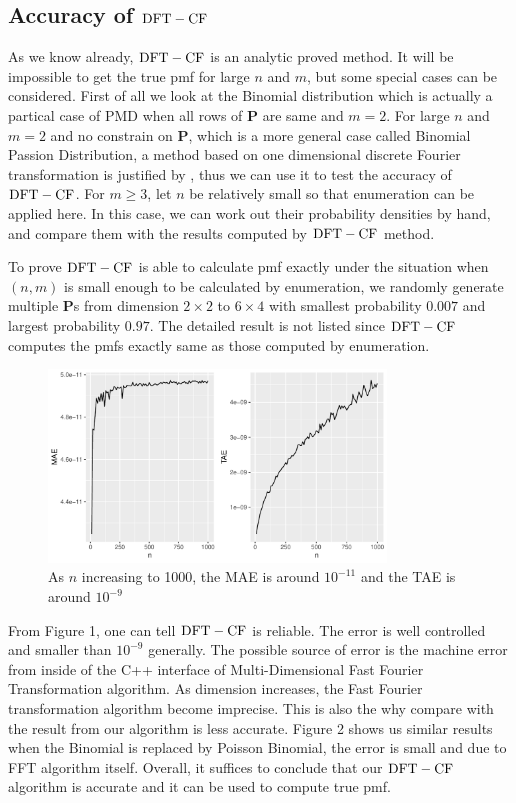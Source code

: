 \documentclass[12pt]{article}
\newcommand{\Pmat}{\mathbf{P}}
\newcommand{\PMD}{\textrm{PMD}}
\newcommand{\dft}{{\rm DFT-CF}}
\begin{document}
\subsection{Accuracy of $\dft$}
As we know already, $\dft$ is an analytic proved method. It will be impossible to get the true pmf for large $n$ and $m$, but some special cases can be considered. First of all we look at the Binomial distribution which is actually a partical case of $\PMD$ when all rows of $\Pmat$ are same and $m=2$. For large $n$ and $m=2$ and no constrain on $\Pmat$, which is a more general case called Binomial Passion Distribution, a method based on one dimensional discrete Fourier transformation is justified by , thus we can use it to test the accuracy of $\dft$. For $m \geq 3$, let $n$ be relatively small so that enumeration can be applied here. In this case, we can work out their probability densities by hand, and compare them with the results computed by $\dft$ method.

To prove $\dft$ is able to calculate pmf exactly under the situation when $(n,m)$ is small enough to be calculated by enumeration, we randomly generate multiple $\Pmat$s from dimension $2 \times 2$ to $6 \times 4$ with smallest probability $0.007$ and largest probability $0.97$. The detailed result is not listed since $\dft$ computes the pmfs exactly same as those computed by enumeration.
\begin{figure}[h!]
	\centering
	\includegraphics[width=0.8\textwidth]{figures/binom.pdf}
	\caption{ As $n$ increasing to 1000, the MAE is around $10^{-11}$ and the TAE is around $10^{-9}$}
	\label{fig: dft accuracy}
\end{figure}

From Figure 1, one can tell $\dft$ is reliable. The error is well controlled and smaller than $10^{-9}$ generally. The possible source of error is the machine error from inside of the C++ interface of Multi-Dimensional Fast Fourier Transformation algorithm. As dimension increases, the Fast Fourier transformation algorithm become imprecise. This is also the why compare with the result from  our algorithm is less accurate. Figure 2 shows us similar results when the Binomial is replaced by Poisson Binomial, the error is small and due to FFT algorithm itself. Overall, it suffices to conclude that our $\dft$ algorithm is accurate and it can be used to compute true pmf.  
\end{document}
